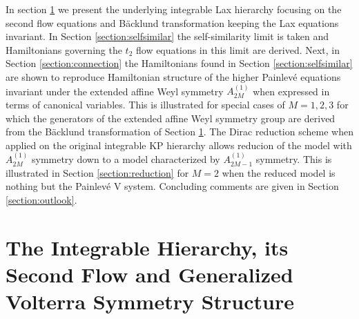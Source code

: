 \documentclass[12pt]{article}
\numberwithin{equation}{section}
\begin{document}
In section \ref{section:integrable} we present the underlying
integrable Lax hierarchy focusing on the second flow equations
and B\"acklund transformation keeping the Lax equations invariant.
In Section \ref{section:selfsimilar} the self-similarity limit
is taken and Hamiltonians governing the $t_2$ flow equations in 
this limit are derived.
Next, in Section \ref{section:connection} the Hamiltonians
found in Section \ref{section:selfsimilar} are shown to reproduce
Hamiltonian structure of the higher Painlev\'e equations
invariant under the extended affine Weyl symmetry $A^{(1)}_{2M}$
when expressed in terms of canonical variables.
This is illustrated for special cases of $M=1,2,3$ for which the 
generators of the extended affine Weyl symmetry group are derived from
the B\"acklund transformation of Section \ref{section:integrable}.
The Dirac reduction scheme when applied on the original integrable 
KP hierarchy allows reducion of the model with
$A^{(1)}_{2M}$ symmetry down to a model characterized
by $A^{(1)}_{2M-1}$ symmetry.
This is illustrated in Section \ref{section:reduction} for $M=2$ when 
the reduced model is nothing but the  Painlev\'e V system.
Concluding comments are given in Section \ref{section:outlook}.


\section{The Integrable Hierarchy, its Second Flow and Generalized 
Volterra Symmetry Structure}
\label{section:integrable}
\end{document}
